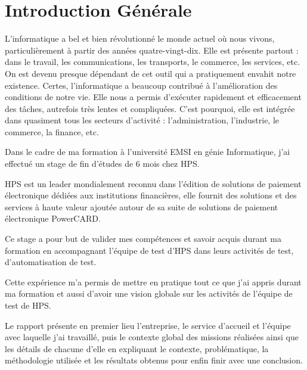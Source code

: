 \newpage
\chapter*{Introduction Générale}

L'informatique a bel et bien révolutionné le monde actuel où nous vivons, particulièrement à partir des années quatre-vingt-dix. Elle est présente partout : dans le travail, les communications, les transports, le commerce, les services, etc. On est devenu presque dépendant de cet outil qui a pratiquement envahit notre existence. Certes, l'informatique a beaucoup contribué à l'amélioration des conditions de notre vie. Elle nous a permis d'exécuter rapidement et efficacement des tâches, autrefois très lentes et compliquées. C'est pourquoi, elle est intégrée dans quasiment tous les secteurs d'activité : l'administration, l'industrie, le commerce, la finance, etc.

Dans le cadre de ma formation à l'université EMSI en génie Informatique, j'ai effectué un stage de fin d'études de 6 mois chez HPS.

HPS est un leader mondialement reconnu dans l'édition de solutions de paiement électronique dédiées aux institutions financières, elle fournit des solutions et des services à haute valeur ajoutée autour de sa suite de solutions de paiement électronique PowerCARD.

Ce stage a pour but de valider mes compétences et savoir acquis durant ma formation en accompagnant l'équipe de test d'HPS dans leurs activités de test, d'automatisation de test.

Cette expérience m'a permis de mettre en pratique tout ce que j'ai appris durant ma formation et aussi d'avoir une vision globale sur les activités de l'équipe de test de HPS.

Le rapport présente en premier lieu l'entreprise, le service d'accueil et l'équipe avec laquelle j'ai travaillé, puis le contexte global des missions réalisées ainsi que les détails de chacune d'elle en expliquant le contexte, problématique, la méthodologie utilisée et les résultats obtenus pour enfin finir avec une conclusion.
